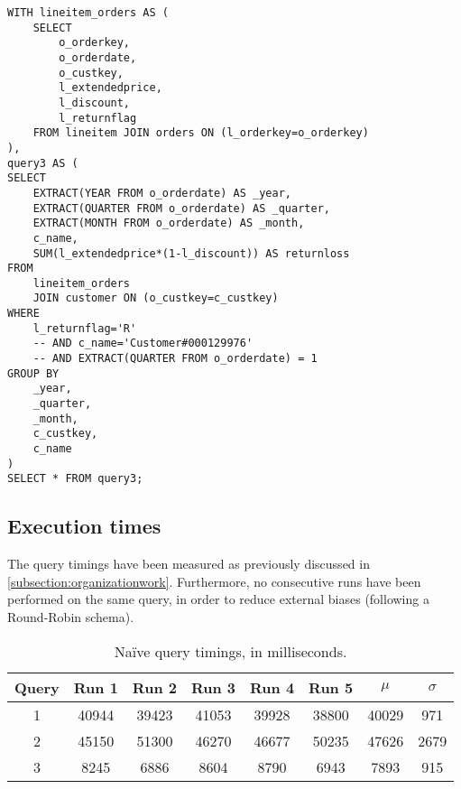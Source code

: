 \begin{lstlisting}
WITH lineitem_orders AS (
	SELECT 
		o_orderkey, 
		o_orderdate, 
		o_custkey, 
		l_extendedprice, 
		l_discount, 
		l_returnflag
	FROM lineitem JOIN orders ON (l_orderkey=o_orderkey)
),
query3 AS (
SELECT
	EXTRACT(YEAR FROM o_orderdate) AS _year,
	EXTRACT(QUARTER FROM o_orderdate) AS _quarter,
	EXTRACT(MONTH FROM o_orderdate) AS _month,
	c_name,
	SUM(l_extendedprice*(1-l_discount)) AS returnloss
FROM
	lineitem_orders
	JOIN customer ON (o_custkey=c_custkey)
WHERE 
	l_returnflag='R'
	-- AND c_name='Customer#000129976'
	-- AND EXTRACT(QUARTER FROM o_orderdate) = 1
GROUP BY
	_year,
	_quarter,
	_month,
	c_custkey,
	c_name
)
SELECT * FROM query3;
\end{lstlisting}

\subsection{Execution times}

The query timings have been measured as previously discussed in \autoref{subsection:organizationwork}.
Furthermore, no consecutive runs have been performed on the same query, in order to reduce external biases (following a Round-Robin schema).

\begin{table}[!h]
\centering
\begin{tabular}{|| c | c c c c c | c c ||} 
 \hline
 Query & Run 1 & Run 2 & Run 3 & Run 4 & Run 5 & 	$\mu$ & $\sigma$ \\ [0.5ex] 
 \hline\hline
 1 & \num{40944} & \num{39423} & \num{41053} & \num{39928} & \num{38800} & \num{40029} & \num{971} \\ 
 \hline
 2 & \num{45150} & \num{51300} & \num{46270} & \num{46677} & \num{50235} & \num{47626} & \num{2679} \\ 
 \hline
 3 & \num{8245} & \num{6886} & \num{8604} & \num{8790} & \num{6943} & \num{7893} & \num{915} \\ 
 \hline
\end{tabular}
  \caption{Na\"{i}ve query timings, in milliseconds.}
  \label{tab:vanillatimings}
\end{table}